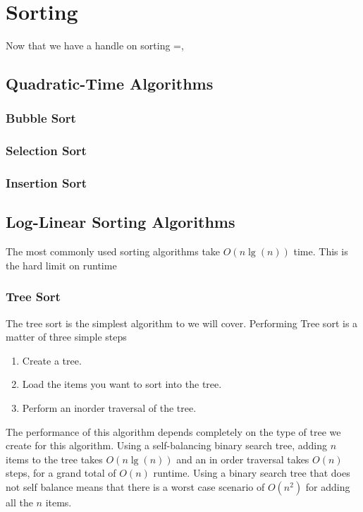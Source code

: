 
\chapter{Sorting}

Now that we have a handle on sorting =,


\section{Quadratic-Time Algorithms}

\subsection{Bubble Sort}

\subsection{Selection Sort}

\subsection{Insertion Sort}


\section{Log-Linear Sorting Algorithms}
The most commonly used sorting algorithms take $ O(n \lg(n)) $ time.
This is the hard limit on runtime %
\subsection{Tree Sort}
The tree sort is the simplest algorithm to we will cover. Performing Tree sort is a matter of three simple steps

\begin{enumerate}
	\item Create a tree.
	\item Load the items you want to sort into the tree.
	\item Perform an inorder traversal of the tree.
\end{enumerate}


The performance of this algorithm depends completely on the type of tree we create for this algorithm.  Using a self-balancing binary search tree, adding $ n $ items to the tree takes $ O(n\lg(n)) $ and an in order traversal takes $ O(n) $ steps, for a grand total of $ O(n) $ runtime.  Using a binary search tree that does not self balance means that there is a worst case scenario of $ O(n^{2}) $ for adding all the $ n $ items.

